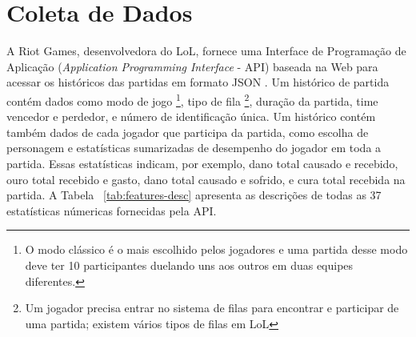 \section{Coleta de Dados}
A Riot Games, desenvolvedora do LoL, fornece uma Interface de Programação de Aplicação (\textit{Application Programming Interface} - API) baseada na Web para acessar os históricos das partidas em formato JSON \cite{riot1}. Um histórico de partida contém dados como modo de jogo \footnote{O modo clássico é o mais escolhido pelos jogadores e uma partida desse modo deve ter 10 participantes duelando uns aos outros em duas equipes diferentes.}, tipo de fila \footnote{Um jogador precisa entrar no sistema de filas para encontrar e participar de uma partida; existem vários tipos de filas em LoL}, duração da partida, time vencedor e perdedor, e número de identificação única. Um histórico contém também dados de cada jogador que participa da partida, como escolha de personagem e estatísticas sumarizadas de desempenho do jogador em toda a partida. Essas estatísticas indicam, por exemplo, dano total causado e recebido, ouro total recebido e gasto, dano total causado e sofrido, e cura total recebida na partida. A Tabela ~\ref{tab:features-desc} apresenta as descrições de todas as 37 estatísticas númericas fornecidas pela API.

